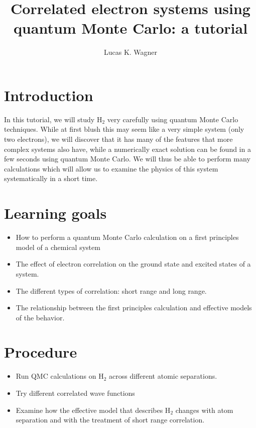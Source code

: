 \documentclass[12pt]{article}
\begin{document}
\title{Correlated electron systems using quantum Monte Carlo: a tutorial}
\author{Lucas K. Wagner}
\maketitle

\section*{Introduction}

In this tutorial, we will study H$_2$ very carefully using quantum Monte Carlo techniques. 
While at first blush this may seem like a very simple system (only two electrons), we will discover that it has many of the features that more complex systems also have, while a numerically exact solution can be found in a few seconds using quantum Monte Carlo.
We will thus be able to perform many calculations which will allow us to examine the physics of this system systematically in a short time. 

\section*{Learning goals} 
\begin{itemize}
\item How to perform a quantum Monte Carlo calculation on a first principles model of a chemical system
\item The effect of electron correlation on the ground state and excited states of a system.
\item The different types of correlation: short range and long range.
\item The relationship between the first principles calculation and effective models of the behavior.
\end{itemize}

\section*{Procedure} 
\begin{itemize}
\item Run QMC calculations on H$_2$ across different atomic separations.
\item Try different correlated wave functions
\item Examine how the effective model that describes H$_2$ changes with atom separation and with the treatment of short range correlation. 	
\end{itemize}
\end{document}
